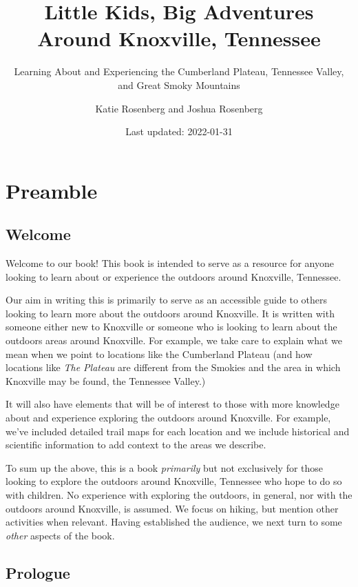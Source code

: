 \documentclass[
]{book}
\title{Little Kids, Big Adventures Around Knoxville, Tennessee}
\subtitle{Learning About and Experiencing the Cumberland Plateau, Tennessee Valley, and Great Smoky Mountains}
\author{Katie Rosenberg and Joshua Rosenberg}
\date{Last updated: 2022-01-31}
\begin{document}
\maketitle

{
\setcounter{tocdepth}{1}
\tableofcontents
}
\hypertarget{preamble}{%
\chapter*{Preamble}\label{preamble}}

\hypertarget{welcome}{%
\section*{Welcome}\label{welcome}}

Welcome to our book! This book is intended to serve as a resource for anyone looking to learn about or experience the outdoors around Knoxville, Tennessee.

Our aim in writing this is primarily to serve as an accessible guide to others looking to learn more about the outdoors around Knoxville. It is written with someone either new to Knoxville or someone who is looking to learn about the outdoors areas around Knoxville. For example, we take care to explain what we mean when we point to locations like the Cumberland Plateau (and how locations like \emph{The Plateau} are different from the Smokies and the area in which Knoxville may be found, the Tennessee Valley.)

It will also have elements that will be of interest to those with more knowledge about and experience exploring the outdoors around Knoxville. For example, we've included detailed trail maps for each location and we include historical and scientific information to add context to the areas we describe.

To sum up the above, this is a book \emph{primarily} but not exclusively for those looking to explore the outdoors around Knoxville, Tennessee who hope to do so with children. No experience with exploring the outdoors, in general, nor with the outdoors around Knoxville, is assumed. We focus on hiking, but mention other activities when relevant. Having established the audience, we next turn to some \emph{other} aspects of the book.

\hypertarget{prologue}{%
\section*{Prologue}\label{prologue}}
\end{document}

